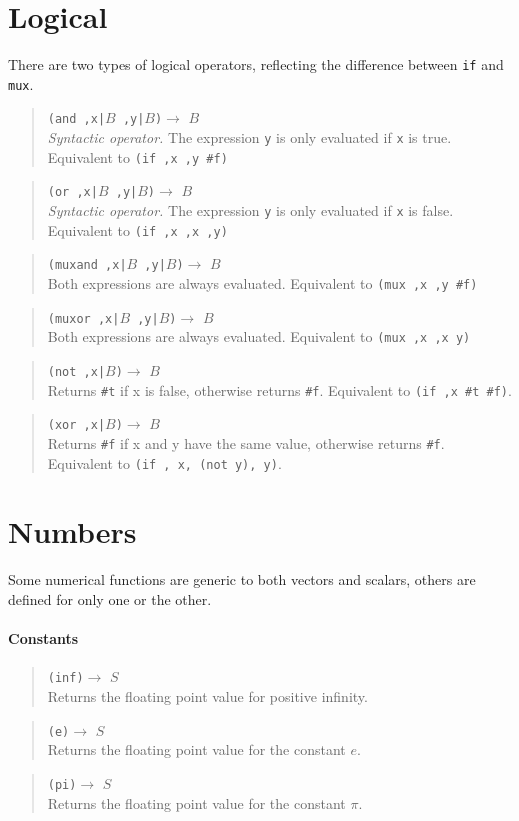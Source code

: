 \documentclass{article}
\newcommand\function[3]
{\begin{quote}{\tt #1}$\rightarrow$ \type{#2} \\ #3 \end{quote}}
\newcommand\syntactic[3]
{\function{#1}{#2}{{\em Syntactic operator.} #3}}
\newcommand\type[1]{$#1$}
\newcommand\var[1]{{\tt #1}}
\begin{document}
\section{Logical}

There are two types of logical operators, reflecting the difference
between \var{if} and \var{mux}.

\syntactic{(and ,x|\type{B} ,y|\type{B})}{B}{The expression \var{y} is only 
  evaluated if \var{x} is true.  Equivalent to \var{(if ,x ,y \#f)}}
\syntactic{(or ,x|\type{B} ,y|\type{B})}{B}{The expression \var{y} is only 
  evaluated if \var{x} is false.  Equivalent to \var{(if ,x ,x ,y)}}
\function{(muxand ,x|\type{B} ,y|\type{B})}{B}{Both expressions are always
  evaluated.  Equivalent to \var{(mux ,x ,y \#f)}}
\function{(muxor ,x|\type{B} ,y|\type{B})}{B}{Both expressions are always
  evaluated.  Equivalent to \var{(mux ,x ,x y)}}

\function{(not ,x|\type{B})}{B}{Returns \var{\#t} if x is false, otherwise
  returns \var{\#f}.  Equivalent to \var{(if ,x \#t \#f)}.}
\function{(xor ,x|\type{B})}{B}{Returns \var{\#f} if x and y have the same value, otherwise
  returns \var{\#f}.  Equivalent to \var{(if , x, (not y), y)}.}
  

\section{Numbers}

Some numerical functions are generic to both vectors and scalars,
others are defined for only one or the other.

\paragraph{Constants}
\function{(inf)}{S}{Returns the floating point value for positive infinity.}
\function{(e)}{S}{Returns the floating point value for the constant $e$.}
\function{(pi)}{S}{Returns the floating point value for the constant $\pi$.}
\end{document}

